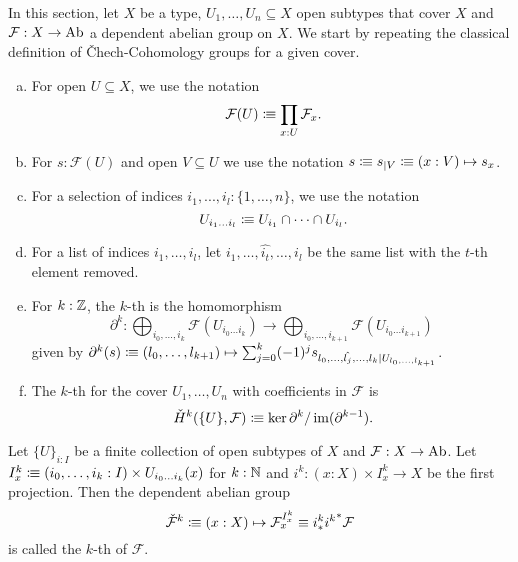 
In this section, let $X$ be a type, $U_1,\dots,U_n\subseteq X$ open subtypes that cover $X$
and $\mathcal F:X\to \operatorname{Ab}$ a dependent abelian group on $X$.
We start by repeating the classical definition of \v{C}hech-Cohomology groups for a given cover.

\begin{definition}%
  \label{chech-complex}
  \begin{enumerate}[(a)]
  \item {} For open $U\subseteq X$, we use the notation
    \[
      \mathcal F(U)\colonequiv \prod_{x:U}\mathcal F_x\rlap{.}
    \]
  \item For $s:\mathcal F(U)$ and open $V\subseteq U$ we use the notation $s\vcentcolon\mspace{-1.2mu}\equiv s_{|V} \vcentcolon\mspace{-1.2mu}\equiv (x:V)\mapsto s_x$.
  \item {}For a selection of indices $i_1,...,i_l:\{1,\dots,n\}$, we use the notation
    \[
      U_{i_1\dots i_l}\colonequiv U_{i_1}\cap\dots\cap U_{i_l}\rlap{.}
    \]
  \item For a list of indices $i_1,\dots,i_l$, let $i_1,\dots,\hat{i_t},\dots,i_l$ be the same list with the $t$-th element removed.
  \item For $k:\mathbb{Z}$, the $k$-th  is the homomorphism
    \[
      \partial^k:\bigoplus_{i_0,\dots,i_k}\mathcal F(U_{i_0\dots i_k})\to \bigoplus_{i_0,\dots,i_{k+1}}\mathcal F(U_{i_0\dots i_{k+1}})
    \]
    given by $\partial^k(s)\vcentcolon\mspace{-1.2mu}\equiv (l_0,\dots,l_{k+1}) \mapsto \sum_{j=0}^k (-1)^j s_{l_0,\dots,\hat{l_j},\dots,l_k|U_{l_0,\dots,l_{k+1}}}$.
  \item The $k$-th  for the cover $U_1,\dots,U_n$ with coefficients in $\mathcal F$ is
    \[
      \check{H}^k(\{U\},\mathcal F)\colonequiv \ker\partial^{k} / \im(\partial^{k-1})\rlap{.}
    \]
  \end{enumerate}
\end{definition}

\begin{definition}
  \label{sheaf-cech}
  Let $\{U\}_{i:I}$ be a finite collection of open subtypes of $X$ and $\mathcal F : X\to \operatorname{Ab}$.
  Let $I_x^k\vcentcolon\mspace{-1.2mu}\equiv (i_0, \dots, i_k:I)\times U_{i_0\dots i_k}(x)$ for $k:\mathbb{N}$ and $i^k:(x:X)\times I^k_x\to X$ be the first projection.
  Then the dependent abelian group
  \[ \check{\mathcal F}^k\vcentcolon\mspace{-1.2mu}\equiv (x:X)\mapsto \mathcal F_x^{I_x^k} \equiv i^k_\ast {i^k}^\ast\mathcal F \]
  is called the $k$-th  of $\mathcal F$.
\end{definition}

